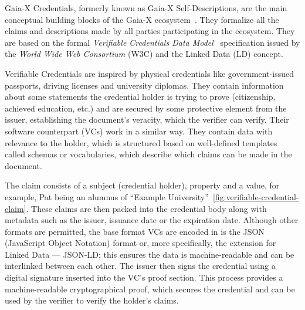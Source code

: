 Gaia-X Credentials, formerly known as Gaia-X Self-Descriptions, are the main conceptual building blocks of the Gaia-X ecosystem~\cite{gaiax_architecture_document}.
They formalize all the claims and descriptions made by all parties participating in the ecosystem.
They are based on the formal \textit{Verifiable Credentials Data Model}~\cite{verifiable_credentials} specification issued by the \textit{World Wide Web Consortium} (W3C) and the Linked Data (LD) concept.

Verifiable Credentials are inspired by physical credentials like government-issued passports, driving licenses and university diplomas.
They contain information about some statements the credential holder is trying to prove (citizenship, achieved education, etc.) and are secured by some protective element from the issuer, establishing the document's veracity, which the verifier can verify.
Their software counterpart (VCs) work in a similar way.
They contain data with relevance to the holder, which is structured based on well-defined templates called schemas or vocabularies, which describe which claims can be made in the document.

The claim consists of a subject (credential holder), property and a value, for example, Pat being an alumnus of ``Example University''~\ref{fig:verifiable-credential-claim}.
These claims are then packed into the credential body along with metadata such as the issuer, issuance date or the expiration date.
Although other formats are permitted, the base format VCs are encoded in is the JSON (JavaScript Object Notation) format or, more specifically, the extension for Linked Data --- JSON-LD; this ensures the data is machine-readable and can be interlinked between each other.
The issuer then signs the credential using a digital signature inserted into the VC's proof section.
This process provides a machine-readable cryptographical proof, which secures the credential and can be used by the verifier to verify the holder's claims.

